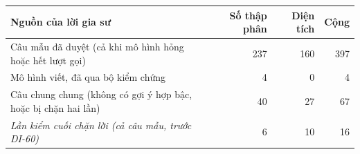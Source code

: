 \small
\begin{tabular}{@{}>{\raggedright\arraybackslash}p{3.4cm}rrr@{}}
\toprule
Nguồn của lời gia sư & Số thập phân & Diện tích & Cộng \\
\midrule
Câu mẫu đã duyệt (cả khi mô hình hỏng hoặc hết lượt gọi) & 237 & 160 & 397 \\
Mô hình viết, đã qua bộ kiểm chứng & 4 & 0 & 4 \\
Câu chung chung (không có gợi ý hợp bậc, hoặc bị chặn hai lần) & 40 & 27 & 67 \\
\midrule
\textit{Lần kiểm cuối chặn lời (cả câu mẫu, trước DI-60)} & 6 & 10 & 16 \\
\bottomrule
\end{tabular}

